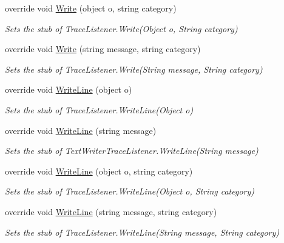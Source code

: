 \begin{DoxyCompactItemize}
override void \hyperlink{class_system_1_1_diagnostics_1_1_fakes_1_1_stub_delimited_list_trace_listener_a30a7974e6075bf3a951cd6baeda45a4c}{Write} (object o, string category)
\begin{DoxyCompactList}\small\item\em Sets the stub of Trace\-Listener.\-Write(\-Object o, String category)\end{DoxyCompactList}\item 
override void \hyperlink{class_system_1_1_diagnostics_1_1_fakes_1_1_stub_delimited_list_trace_listener_aafc0bafc7c13dfbb53ef322f176a2771}{Write} (string message, string category)
\begin{DoxyCompactList}\small\item\em Sets the stub of Trace\-Listener.\-Write(\-String message, String category)\end{DoxyCompactList}\item 
override void \hyperlink{class_system_1_1_diagnostics_1_1_fakes_1_1_stub_delimited_list_trace_listener_a15034d6d7474a2e51af8040e6a05c050}{Write\-Line} (object o)
\begin{DoxyCompactList}\small\item\em Sets the stub of Trace\-Listener.\-Write\-Line(\-Object o)\end{DoxyCompactList}\item 
override void \hyperlink{class_system_1_1_diagnostics_1_1_fakes_1_1_stub_delimited_list_trace_listener_a8994f34d7e0ba34b6afa2a8d856ecfb3}{Write\-Line} (string message)
\begin{DoxyCompactList}\small\item\em Sets the stub of Text\-Writer\-Trace\-Listener.\-Write\-Line(\-String message)\end{DoxyCompactList}\item 
override void \hyperlink{class_system_1_1_diagnostics_1_1_fakes_1_1_stub_delimited_list_trace_listener_a63f0adfa16c759ae803f9ef20f218681}{Write\-Line} (object o, string category)
\begin{DoxyCompactList}\small\item\em Sets the stub of Trace\-Listener.\-Write\-Line(\-Object o, String category)\end{DoxyCompactList}\item 
override void \hyperlink{class_system_1_1_diagnostics_1_1_fakes_1_1_stub_delimited_list_trace_listener_aeabc514d12e8f643e6af571ec4e3ae7c}{Write\-Line} (string message, string category)
\begin{DoxyCompactList}\small\item\em Sets the stub of Trace\-Listener.\-Write\-Line(\-String message, String category)\end{DoxyCompactList}\end{DoxyCompactItemize}
